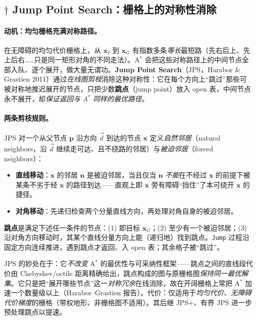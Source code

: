 \subsection{\texorpdfstring{$\dagger$}{x} Jump Point Search：栅格上的对称性消除}
\label{sec:plan-jps}

\paragraph{动机：均匀栅格充满对称路径。}
在无障碍的均匀代价栅格上，从 $\mathbf{x}_I$ 到 $\mathbf{x}_G$ 有指数多条\emph{等长}最短路（先右后上、先上后右……只是同一矩形对角的不同走法）。A$^*$ 会把这些对称路径上的中间节点全部入队、逐个展开，做大量无谓功。\textbf{Jump Point Search}（JPS，Harabor \& Grastien 2011\cite{harabor2011jps}）通过\emph{在线图剪枝}消除这种对称性：它在每个方向上“跳过”那些可被对称地推迟展开的节点，只把少数\textbf{跳点}（jump point）放入 open 表，中间节点永不展开，却\emph{保证返回与 A$^*$ 同样的最优路径}。

\paragraph{两条剪枝规则。}
JPS 对一个从父节点 $\mathbf{p}$ 沿方向 $\vec{d}$ 到达的节点 $\mathbf{x}$ 定义\emph{自然邻居}（natural neighbors，沿 $\vec{d}$ 继续走可达、且不绕路的邻居）与\emph{被迫邻居}（forced neighbors）：
\begin{itemize}
  \item \textbf{直线移动}：$\mathbf{x}$ 的邻居 $\mathbf{n}$ 是被迫邻居，当且仅当 $\mathbf{n}$ \emph{不能}在不经过 $\mathbf{x}$ 的前提下被某条不劣于经 $\mathbf{x}$ 的路径到达——直观上即 $\mathbf{x}$ 旁有障碍“挡住”了本可绕开 $\mathbf{x}$ 的捷径。
  \item \textbf{对角移动}：先递归检查两个分量直线方向，再处理对角自身的被迫邻居。
\end{itemize}
\textbf{跳点}是满足下述任一条件的节点：(1) 即目标 $\mathbf{x}_G$；(2) 至少有一个被迫邻居；(3) 沿对角方向移动时，其某个直线分量方向上能（递归地）找到跳点。\texttt{Jump} 过程沿固定方向连续推进，遇到跳点才返回、入 open 表；其余格子被“跳过”。

\begin{insight}
JPS 的妙处在于：它\emph{不改变} A$^*$ 的最优性与可采纳性框架——跳点之间的直线段代价由 Chebyshev/octile 距离精确给出，跳点构成的图与原栅格图\emph{保持同一最优解集}。它只是把“展开哪些节点”这一\emph{对称冗余}在线消除，故在开阔栅格上常把 A$^*$ 加速一个数量级以上（Harabor--Grastien 报告）。代价：仅适用于\emph{均匀代价、无障碍代价梯度}的栅格（带权地形、非栅格图不适用）。其后继 JPS+、有界 JPS 进一步预处理跳点以提速。
\end{insight}

